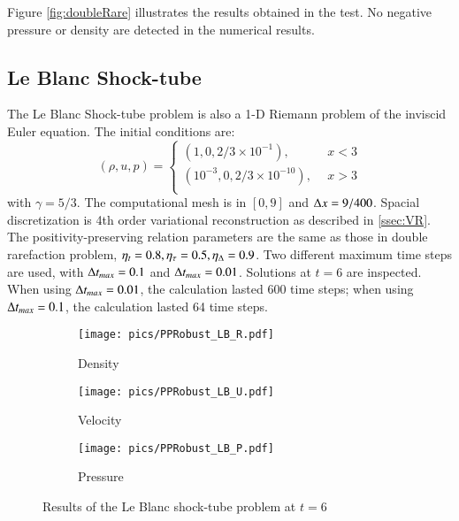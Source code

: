 \documentclass[preprint,12pt]{elsarticle}
\begin{document}
Figure \ref{fig:doubleRare} illustrates the results obtained in the 
test. No negative pressure or density are detected in the numerical
results.

\subsection{Le Blanc Shock-tube}

The Le Blanc Shock-tube problem \cite{hu2013positivity} is also a 1-D 
Riemann problem of the inviscid Euler equation. 
The initial conditions are:
\begin{equation}
    (\rho,u,p) = \left\{
        \begin{array}{ll}
            (1,0,2/3\times10^{-1}),\ \ & x < 3\\
            (10^{-3},0,2/3\times10^{-10}),\ \ & x > 3\\
        \end{array}
    \right.
\end{equation}
with $\gamma = 5/3$.
The computational mesh is in $[0,9]$ and $\mathrm\Delta x =9/400$.
Spacial discretization is 4th order variational reconstruction
as described in \ref{ssec:VR}. 
The positivity-preserving relation parameters are the same as 
those in double rarefaction problem, $\eta_t= 0.8, \eta_\tau=0.5, \eta_\mathrm\Delta=0.9$.
Two different maximum time steps are used, with $\mathrm\Delta t_{max} = 0.1$ and $\mathrm\Delta t_{max} = 0.01$.
Solutions at $t=6$ are inspected.
When using $\mathrm\Delta t_{max} = 0.01$, the calculation lasted 600 time steps;
when using $\mathrm\Delta t_{max} = 0.1$, the calculation lasted 64 time steps.

\begin{figure}[htbp]
    \centering
    \begin{subfigure}{0.33\textwidth}
        \texttt{[image: pics/PPRobust\_LB\_R.pdf]}
        \caption[]{Density}
    \end{subfigure}\hfill
    \begin{subfigure}{0.33\textwidth}
        \texttt{[image: pics/PPRobust\_LB\_U.pdf]}
        \caption[]{Velocity}
    \end{subfigure}\hfill
    \begin{subfigure}{0.33\textwidth}
        \texttt{[image: pics/PPRobust\_LB\_P.pdf]}
        \caption[]{Pressure}
    \end{subfigure}
    \caption{Results of the Le Blanc shock-tube problem at $t=6$}
    \label{fig:leBlanc}
\end{figure}
\end{document}
